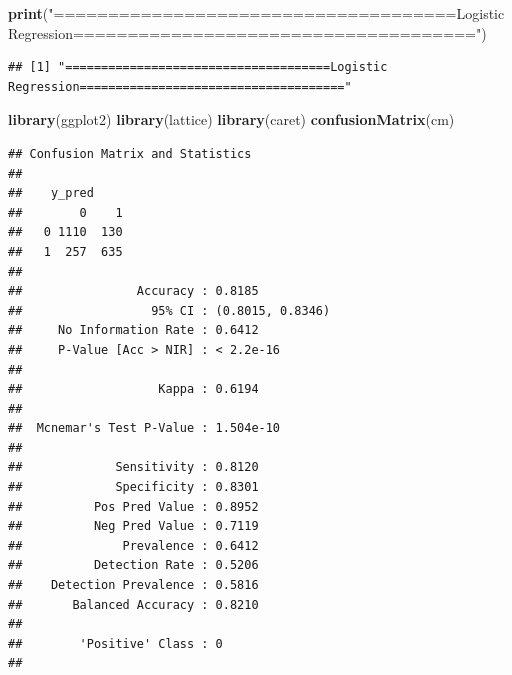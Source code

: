 \documentclass[
]{article}
\newenvironment{Shaded}{\begin{snugshade}}{\end{snugshade}}
\newcommand{\KeywordTok}[1]{\textcolor[rgb]{0.13,0.29,0.53}{\textbf{#1}}}
\newcommand{\NormalTok}[1]{#1}
\newcommand{\StringTok}[1]{\textcolor[rgb]{0.31,0.60,0.02}{#1}}
\begin{document}
\begin{Shaded}
\begin{Highlighting}[]
\KeywordTok{print}\NormalTok{(}\StringTok{"=====================================Logistic Regression====================================="}\NormalTok{)}
\end{Highlighting}
\end{Shaded}

\begin{verbatim}
## [1] "=====================================Logistic Regression====================================="
\end{verbatim}

\begin{Shaded}
\begin{Highlighting}[]
\KeywordTok{library}\NormalTok{(ggplot2)}
\KeywordTok{library}\NormalTok{(lattice)}
\KeywordTok{library}\NormalTok{(caret)}
\KeywordTok{confusionMatrix}\NormalTok{(cm)}
\end{Highlighting}
\end{Shaded}

\begin{verbatim}
## Confusion Matrix and Statistics
## 
##    y_pred
##        0    1
##   0 1110  130
##   1  257  635
##                                           
##                Accuracy : 0.8185          
##                  95% CI : (0.8015, 0.8346)
##     No Information Rate : 0.6412          
##     P-Value [Acc > NIR] : < 2.2e-16       
##                                           
##                   Kappa : 0.6194          
##                                           
##  Mcnemar's Test P-Value : 1.504e-10       
##                                           
##             Sensitivity : 0.8120          
##             Specificity : 0.8301          
##          Pos Pred Value : 0.8952          
##          Neg Pred Value : 0.7119          
##              Prevalence : 0.6412          
##          Detection Rate : 0.5206          
##    Detection Prevalence : 0.5816          
##       Balanced Accuracy : 0.8210          
##                                           
##        'Positive' Class : 0               
## 
\end{verbatim}
\end{document}
